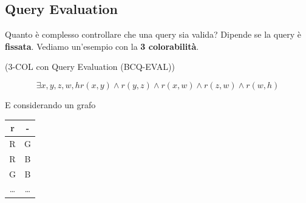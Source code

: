 \subsection{Query Evaluation}

Quanto è complesso controllare che una query sia valida? Dipende se la query è \textbf{fissata}. Vediamo un'esempio con la \textbf{3 colorabilità}.

\begin{esempio}
    (3-COL con Query Evaluation (BCQ-EVAL))

    \begin{equation}
        \exists x,y,z,w,h r(x,y) \land r(y,z) \land r(x,w) \land r(z,w) \land r(w,h)
    \end{equation}

    E considerando un grafo
    
    \begin{figure}[H]
        \begin{center}
        \end{center}
    \end{figure}

    \begin{table}[H]
        \begin{center}
            \begin{tabular}{|c|c|}
                \hline
                \textbf{r} & \textbf{-} \\
                \hline
                R & G \\
                \hline 
                R & B \\
                \hline

                G & B \\
                \hline
                \dots & \dots \\
                \hline
            \end{tabular}
        \end{center}
    \end{table}
\end{esempio}

